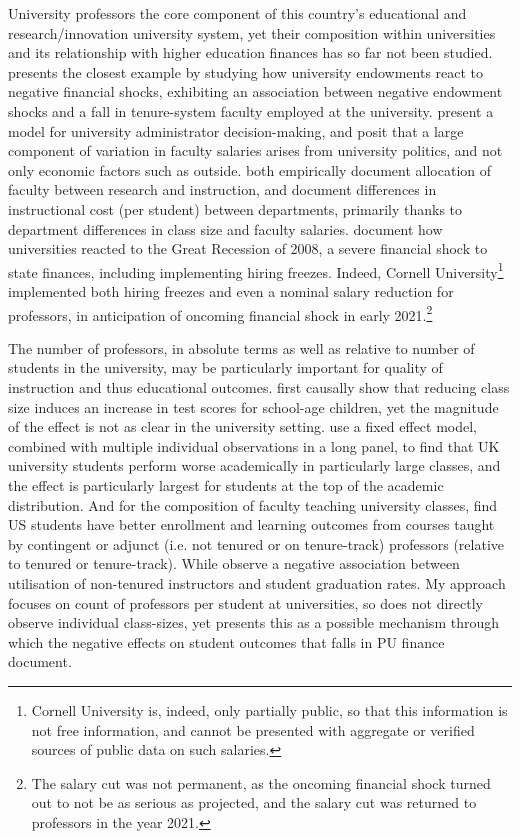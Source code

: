 \documentclass[notitlepage,12pt]{article}
\begin{document}
University professors the core component of this country's educational and research/innovation university system, yet their composition within universities and its relationship with higher education finances has so far not been studied.
\cite{brown2014endowment} presents the closest example by studying how university endowments react to negative financial shocks, exhibiting an association between negative endowment shocks and a fall in tenure-system faculty employed at the university.
\cite{abe2015implications} present a model for university administrator decision-making, and posit that a large component of variation in faculty salaries arises from university politics, and not only economic factors such as outside.
\cite{johnson2009jep,NBERc13879} both empirically document allocation of faculty between research and instruction, and \cite{hemelt2021math} document differences in instructional cost (per student) between departments, primarily thanks to department differences in class size and faculty salaries.
\cite{turner2014impact} document how universities reacted to the Great Recession of 2008, a severe financial shock to state finances, including implementing hiring freezes.
Indeed, Cornell University\footnote{
    Cornell University is, indeed, only partially public, so that this information is not free information, and cannot be presented with aggregate or verified sources of public data on such salaries.
} implemented both hiring freezes and even a nominal salary reduction for professors, in anticipation of oncoming financial shock in early 2021.\footnote{
    The salary cut was not permanent, as the oncoming financial shock turned out to not be as serious as projected, and the salary cut was returned to professors in the year 2021.
}

The number of professors, in absolute terms as well as relative to number of students in the university, may be particularly important for quality of instruction and thus educational outcomes.
\cite{angrist1999using} first causally show that reducing class size induces an increase in test scores for school-age children, yet the magnitude of the effect is not as clear in the university setting.
\cite{bandiera2010heterogeneous} use a fixed effect model, combined with multiple individual observations in a long panel, to find that UK university students perform worse academically in particularly large classes, and the effect is particularly largest for students at the top of the academic distribution.
And for the composition of faculty teaching university classes, 
\cite{bettinger2010does,figlio2015tenure} find US students have better enrollment and learning outcomes from courses taught by contingent or adjunct (i.e. not tenured or on tenure-track) professors (relative to tenured or tenure-track).
While \cite{ehrenberg2005tenured} observe a negative association between utilisation of non-tenured instructors and student graduation rates.
My approach focuses on count of professors per student at universities, so does not directly observe individual class-sizes, yet presents this as a possible mechanism through which the negative effects on student outcomes that falls in PU finance \cite{NBERw23736,NBERw27885} document.
\end{document}
